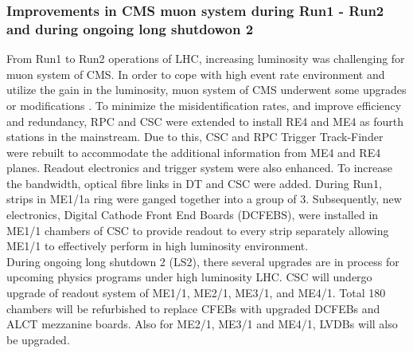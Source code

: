 \subsubsection{Improvements in CMS muon system during Run1 - Run2 and during ongoing long shutdowon 2}
From Run1 to Run2 operations of LHC, increasing luminosity was challenging for muon system of CMS. In order to cope with high event rate environment and utilize the gain in the luminosity, muon system of CMS underwent some upgrades or modifications \cite{Sirunyan:2018fpa}.
To minimize the misidentification rates, and improve efficiency and redundancy, RPC and CSC were extended to install RE4 and ME4 as fourth stations in the mainstream.
Due to this,  CSC and RPC Trigger Track-Finder were rebuilt to accommodate the additional information from ME4 and RE4 planes.
Readout electronics and trigger system were also enhanced.  To increase the bandwidth, optical fibre links in DT and CSC were added. During Run1, strips in ME1/1a ring were ganged together into a group of 3. Subsequently, new electronics, Digital Cathode Front End Boards (DCFEBS), were installed in ME1/1 chambers of CSC to provide readout to every strip separately allowing ME1/1 to effectively perform in high luminosity environment.\\
During ongoing long shutdown 2 (LS2), there several upgrades are in process for upcoming physics programs under high luminosity LHC.
CSC will undergo upgrade of readout system of ME1/1, ME2/1, ME3/1, and ME4/1. Total 180 chambers will be refurbished to replace CFEBs with upgraded DCFEBs and ALCT mezzanine boards. Also for ME2/1, ME3/1 and ME4/1, LVDBs will also be upgraded.\\

